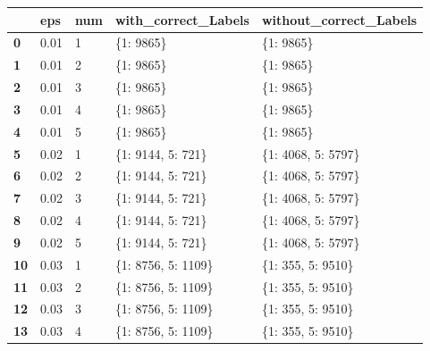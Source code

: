 \documentclass[11pt,onside]{article}
\begin{document}
\begin{table}[]
\footnotesize
\centering
\begin{tabular}{|l|l|l|l|l|}
\hline
            & \textbf{eps} & \textbf{num} & \textbf{with\_correct\_Labels}            & \textbf{without\_correct\_Labels} \\ \hline
\textbf{0}  & 0.01         & 1            & \{1: 9865\}                               & \{1: 9865\}              \\ \hline
\textbf{1}  & 0.01         & 2            & \{1: 9865\}                               & \{1: 9865\}              \\ \hline
\textbf{2}  & 0.01         & 3            & \{1: 9865\}                               & \{1: 9865\}              \\ \hline
\textbf{3}  & 0.01         & 4            & \{1: 9865\}                               & \{1: 9865\}              \\ \hline
\textbf{4}  & 0.01         & 5            & \{1: 9865\}                               & \{1: 9865\}              \\ \hline
\textbf{5}  & 0.02         & 1            & \{1: 9144, 5: 721\}                       & \{1: 4068, 5: 5797\}     \\ \hline
\textbf{6}  & 0.02         & 2            & \{1: 9144, 5: 721\}                       & \{1: 4068, 5: 5797\}     \\ \hline
\textbf{7}  & 0.02         & 3            & \{1: 9144, 5: 721\}                       & \{1: 4068, 5: 5797\}     \\ \hline
\textbf{8}  & 0.02         & 4            & \{1: 9144, 5: 721\}                       & \{1: 4068, 5: 5797\}     \\ \hline
\textbf{9}  & 0.02         & 5            & \{1: 9144, 5: 721\}                       & \{1: 4068, 5: 5797\}     \\ \hline
\textbf{10} & 0.03         & 1            & \{1: 8756, 5: 1109\}                      & \{1: 355, 5: 9510\}      \\ \hline
\textbf{11} & 0.03         & 2            & \{1: 8756, 5: 1109\}                      & \{1: 355, 5: 9510\}      \\ \hline
\textbf{12} & 0.03         & 3            & \{1: 8756, 5: 1109\}                      & \{1: 355, 5: 9510\}      \\ \hline
\textbf{13} & 0.03         & 4            & \{1: 8756, 5: 1109\}                      & \{1: 355, 5: 9510\}      \\ \hline

\end{tabular}
\end{table}
\end{document}

